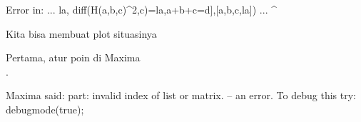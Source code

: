 \documentclass[12pt,Times new roman,letterpaper]{book}
\begin{document}
\begin{eulernootebook}
\begin{eulercomment}
\begin{eulercomment}
\begin{eulernootebook}
\begin{eulercomment}
\begin{eulercomment}
\begin{eulercomment}
\begin{eulercomment}
\begin{eulercomment}
\begin{eulercomment}
\begin{eulernotebook}
\begin{eulercomment}
\begin{euleroutput}
  Error in:
  ... la,    diff(H(a,b,c)^2,c)=la,a+b+c=d],[a,b,c,la]) ...
                                                       ^
\end{euleroutput}
\begin{eulercomment}
Kita bisa membuat plot situasinya
\end{eulercomment}
\begin{eulercomment}
Pertama, atur poin di Maxima\\
.
\end{eulercomment}
\begin{euleroutput}
  Maxima said:
  part: invalid index of list or matrix.
   -- an error. To debug this try: debugmode(true);
  

\end{euleroutput}
\end{eulercomment}
\end{eulernotebook}
\end{eulercomment}
\end{eulercomment}
\end{eulercomment}
\end{eulercomment}
\end{eulercomment}
\end{eulercomment}
\end{eulernootebook}
\end{eulercomment}
\end{eulercomment}
\end{eulernootebook}
\end{document}
